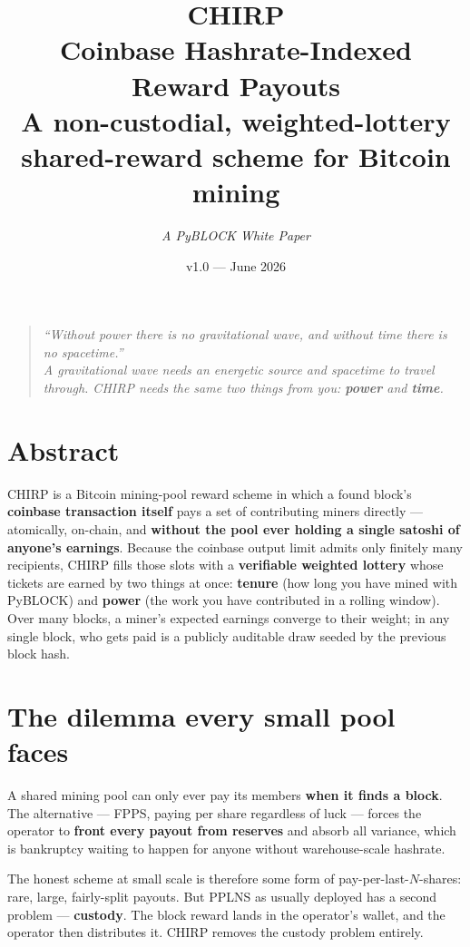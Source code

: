 \documentclass[11pt]{article}
\title{\vspace{-1.2cm}\textbf{\color{pyblockgreen}CHIRP}\\[2pt]
\large Coinbase Hashrate-Indexed Reward Payouts\\[4pt]
\normalsize A non-custodial, weighted-lottery shared-reward scheme for Bitcoin mining}
\author{\textit{A PyBLOCK White Paper}}
\date{v1.0 --- June 2026}
\begin{document}
\maketitle

\begin{quote}\itshape
``Without power there is no gravitational wave, and without time there is no spacetime.''\\
\normalfont A gravitational wave needs an energetic source \emph{and} spacetime to travel through.
CHIRP needs the same two things from you: \textbf{power} and \textbf{time}.
\end{quote}

\section*{Abstract}
CHIRP is a Bitcoin mining-pool reward scheme in which a found block's \textbf{coinbase transaction
itself} pays a set of contributing miners directly --- atomically, on-chain, and \textbf{without
the pool ever holding a single satoshi of anyone's earnings}. Because the coinbase output limit
admits only finitely many recipients, CHIRP fills those slots with a \textbf{verifiable weighted
lottery} whose tickets are earned by two things at once: \textbf{tenure} (how long you have mined
with PyBLOCK) and \textbf{power} (the work you have contributed in a rolling window). Over many
blocks, a miner's expected earnings converge to their weight; in any single block, who gets paid is
a publicly auditable draw seeded by the previous block hash.

\section{The dilemma every small pool faces}
A shared mining pool can only ever pay its members \textbf{when it finds a block}. The alternative
--- FPPS, paying per share regardless of luck --- forces the operator to \textbf{front every payout
from reserves} and absorb all variance, which is bankruptcy waiting to happen for anyone without
warehouse-scale hashrate.

The honest scheme at small scale is therefore some form of pay-per-last-$N$-shares: rare, large,
fairly-split payouts. But PPLNS as usually deployed has a second problem --- \textbf{custody}. The
block reward lands in the operator's wallet, and the operator then distributes it. CHIRP removes
the custody problem entirely.
\end{document}
